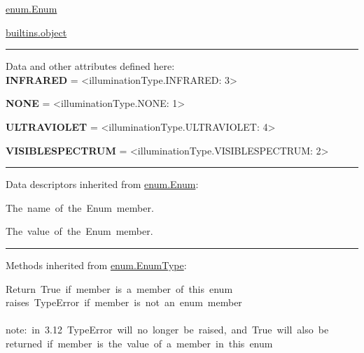 \begin{longtable}[]
\begin{minipage}[t]{\linewidth}
\begin{longtable}[]
\begin{minipage}[t]{\linewidth}
\begin{description}
\href{enum.html\#Enum}{enum.Enum}

\href{builtins.html\#object}{builtins.object}
\end{description}

\begin{center}\rule{0.5\linewidth}{0.5pt}\end{center}

Data and other attributes defined here:\\

\textbf{INFRARED} = \textless illuminationType.INFRARED: 3\textgreater{}

\textbf{NONE} = \textless illuminationType.NONE: 1\textgreater{}

\textbf{ULTRAVIOLET} = \textless illuminationType.ULTRAVIOLET:
4\textgreater{}

\textbf{VISIBLESPECTRUM} = \textless illuminationType.VISIBLESPECTRUM:
2\textgreater{}

\begin{center}\rule{0.5\linewidth}{0.5pt}\end{center}

Data descriptors inherited from \href{enum.html\#Enum}{enum.Enum}:\\

\begin{description}
\tightlist
\item[\textbf{name}]
{The~name~of~the~Enum~member.}
\end{description}

\begin{description}
\tightlist
\item[\textbf{value}]
{The~value~of~the~Enum~member.}
\end{description}

\begin{center}\rule{0.5\linewidth}{0.5pt}\end{center}

Methods inherited from \href{enum.html\#EnumType}{enum.EnumType}:\\

\begin{description}
\tightlist
\item[\protect\hypertarget{illuminationType-__contains__}{}{\textbf{\_\_contains\_\_}}(member){{
from \href{enum.html\#EnumType}{enum.EnumType}}}]
{Return~True~if~member~is~a~member~of~this~enum\\
raises~TypeError~if~member~is~not~an~enum~member\\
\hspace*{0.333em}\\
note:~in~3.12~TypeError~will~no~longer~be~raised,~and~True~will~also~be\\
returned~if~member~is~the~value~of~a~member~in~this~enum}
\end{description}


\end{minipage}
\end{longtable}
\end{minipage}
\end{longtable}
